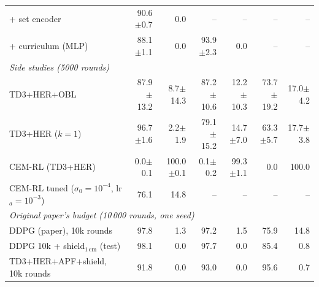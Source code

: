 \begin{table}[t]
\begin{tabular}{lrrrrrr}
\quad + set encoder & 90.6$\pm$0.7 & 0.0 & -- & -- & -- & -- \\
\quad + curriculum (MLP) & 88.1$\pm$1.1 & 0.0 & 93.9$\pm$2.3 & 0.0 & -- & -- \\
\midrule
\multicolumn{7}{l}{\textit{Side studies (5000 rounds)}} \\
TD3+HER+OBL & 87.9$\pm$13.2 & 8.7$\pm$14.3 & 87.2$\pm$10.6 & 12.2$\pm$10.3 & 73.7$\pm$19.2 & 17.0$\pm$4.2 \\
TD3+HER ($k{=}1$) & 96.7$\pm$1.6 & 2.2$\pm$1.9 & 79.1$\pm$15.2 & 14.7$\pm$7.0 & 63.3$\pm$5.7 & 17.7$\pm$3.8 \\
CEM-RL (TD3+HER) & 0.0$\pm$0.1 & 100.0$\pm$0.1 & 0.1$\pm$0.2 & 99.3$\pm$1.1 & 0.0 & 100.0 \\
CEM-RL tuned ($\sigma_0{=}10^{-4}$, lr$_a{=}10^{-3}$) & 76.1 & 14.8 & -- & -- & -- & -- \\
\midrule
\multicolumn{7}{l}{\textit{Original paper's budget (10\,000 rounds, one seed)}} \\
DDPG (paper), 10k rounds & 97.8 & 1.3 & 97.2 & 1.5 & 75.9 & 14.8 \\
DDPG 10k + shield$_{1\,\mathrm{cm}}$ (test) & 98.1 & 0.0 & 97.7 & 0.0 & 85.4 & 0.8 \\
TD3+HER+APF+shield, 10k rounds & 91.8 & 0.0 & 93.0 & 0.0 & 95.6 & 0.7 \\
\bottomrule
\end{tabular}
\end{table}